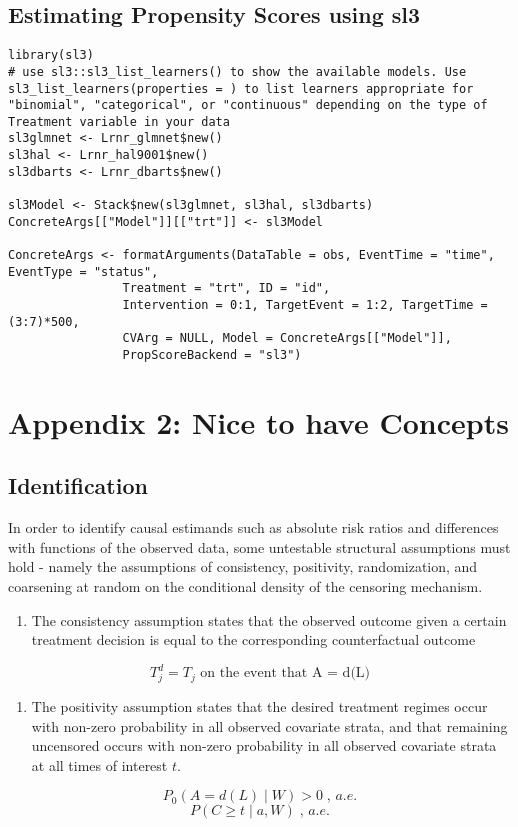 \documentclass{report}
\newcommand{\1}{\ensuremath{\mathbf{1}}}
\renewcommand{\L}{\ensuremath{W}}
\begin{document}
\subsection{Estimating Propensity Scores using sl3}
\label{sec:orga71d4e0}

\begin{lstlisting}
library(sl3)
# use sl3::sl3_list_learners() to show the available models. Use sl3_list_learners(properties = ) to list learners appropriate for "binomial", "categorical", or "continuous" depending on the type of Treatment variable in your data
sl3glmnet <- Lrnr_glmnet$new()
sl3hal <- Lrnr_hal9001$new()
sl3dbarts <- Lrnr_dbarts$new()

sl3Model <- Stack$new(sl3glmnet, sl3hal, sl3dbarts)
ConcreteArgs[["Model"]][["trt"]] <- sl3Model

ConcreteArgs <- formatArguments(DataTable = obs, EventTime = "time", EventType = "status", 
				Treatment = "trt", ID = "id", 
				Intervention = 0:1, TargetEvent = 1:2, TargetTime = (3:7)*500, 
				CVArg = NULL, Model = ConcreteArgs[["Model"]], 
				PropScoreBackend = "sl3")
\end{lstlisting}


\section{Appendix 2: Nice to have Concepts}
\label{sec:org4bb1f8b}

\subsection{Identification}
\label{identification}
In order to identify causal estimands such as absolute risk ratios and differences with functions of the observed data, some untestable structural assumptions must hold - namely the assumptions of consistency, positivity, randomization, and coarsening at random on the conditional density of the censoring mechanism. 


\begin{enumerate}
\item The consistency assumption states that the observed outcome given a certain treatment decision is equal to the corresponding counterfactual outcome
\end{enumerate}
\[ T^d_j = T_j \text{ on the event that A = d(L)} \]

\begin{enumerate}
\item The positivity assumption states that the desired treatment regimes occur with non-zero probability in all observed covariate strata, and that remaining uncensored occurs with non-zero probability in all observed covariate strata at all times of interest \(t\).
\end{enumerate}
\[ P_0\left( A = d(L) \mid \L \right) > 0 \;,\, a.e. \]
\[ P(C \geq t \mid a, \L) \;,\, a.e. \]
\end{document}
